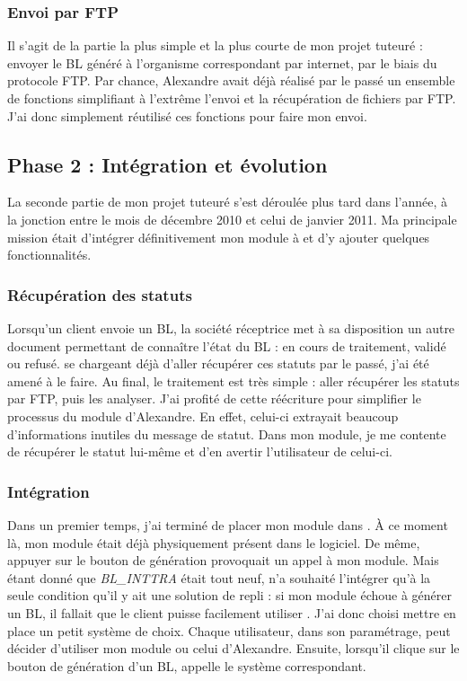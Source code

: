 \subsubsection{Envoi par FTP}
Il s'agit de la partie la plus simple et la plus courte de mon projet tuteuré : envoyer le BL généré à l'organisme correspondant par internet, par le biais du protocole FTP. Par chance, Alexandre avait déjà réalisé par le passé un ensemble de fonctions simplifiant à l'extrême l'envoi et la récupération de fichiers par FTP. J'ai donc simplement réutilisé ces fonctions pour faire mon envoi.

\subsection{Phase 2 : Intégration et évolution}
La seconde partie de mon projet tuteuré s'est déroulée plus tard dans l'année, à la jonction entre le mois de décembre 2010 et celui de janvier 2011. Ma principale mission était d'intégrer définitivement mon module à \integrale{} et d'y ajouter quelques fonctionnalités.

\subsubsection{Récupération des statuts}
Lorsqu'un client envoie un BL, la société réceptrice met à sa disposition un autre document permettant de connaître l'état du BL : en cours de traitement, validé ou refusé. \pireus{} se chargeant déjà d'aller récupérer ces statuts par le passé, j'ai été amené à le faire. Au final, le traitement est très simple : aller récupérer les statuts par FTP, puis les analyser. J'ai profité de cette réécriture pour simplifier le processus du module d'Alexandre. En effet, celui-ci extrayait beaucoup d'informations inutiles du message de statut. Dans mon module, je me contente de récupérer le statut lui-même et d'en avertir l'utilisateur de celui-ci.

\subsubsection{Intégration}
Dans un premier temps, j'ai terminé de placer mon module dans \integrale. À ce moment là, mon module était déjà physiquement présent dans le logiciel. De même, appuyer sur le bouton de génération provoquait un appel à mon module. Mais étant donné que \emph{BL\_INTTRA} était tout neuf, \solulog{} n'a souhaité l'intégrer qu'à la seule condition qu'il y ait une solution de repli : si mon module échoue à générer un BL, il fallait que le client puisse facilement utiliser \pireus. J'ai donc choisi mettre en place un petit système de choix. Chaque utilisateur, dans son paramétrage, peut décider d'utiliser mon module ou celui d'Alexandre. Ensuite, lorsqu'il clique sur le bouton de génération d'un BL, \integrale{} appelle le système correspondant.

